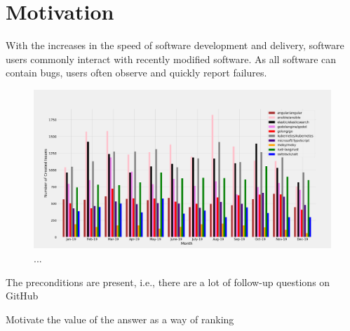 \section{Motivation}


With the increases in the speed of software development and delivery, software users
commonly interact with recently modified software. As all software can contain bugs,
users often observe and quickly report failures. 


\begin{figure}[t]
\centering
\includegraphics[width=0.99\linewidth]{figures/repos_month_bar.png}
\caption{...}
\label{fig:repo_activity}
\end{figure}



The preconditions are present, i.e., there are a lot of follow-up questions on GitHub






Motivate the value of the answer as a way of ranking
